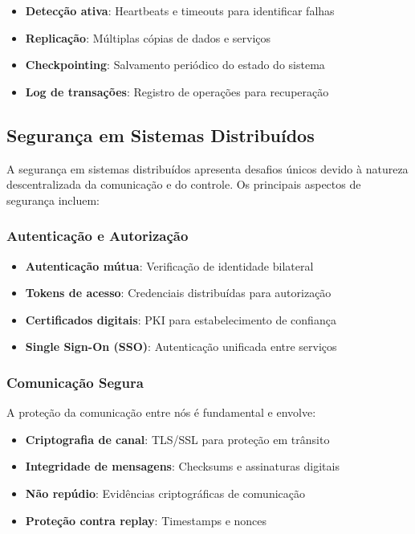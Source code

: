 \begin{itemize}
    \item \textbf{Detecção ativa}: Heartbeats e timeouts para identificar falhas
    \item \textbf{Replicação}: Múltiplas cópias de dados e serviços
    \item \textbf{Checkpointing}: Salvamento periódico do estado do sistema
    \item \textbf{Log de transações}: Registro de operações para recuperação
\end{itemize}

\subsection{Segurança em Sistemas Distribuídos}

A segurança em sistemas distribuídos apresenta desafios únicos devido à natureza descentralizada da comunicação e do controle. Os principais aspectos de segurança incluem:

\subsubsection{Autenticação e Autorização}

\begin{itemize}
    \item \textbf{Autenticação mútua}: Verificação de identidade bilateral
    \item \textbf{Tokens de acesso}: Credenciais distribuídas para autorização
    \item \textbf{Certificados digitais}: PKI para estabelecimento de confiança
    \item \textbf{Single Sign-On (SSO)}: Autenticação unificada entre serviços
\end{itemize}

\subsubsection{Comunicação Segura}

A proteção da comunicação entre nós é fundamental e envolve:

\begin{itemize}
    \item \textbf{Criptografia de canal}: TLS/SSL para proteção em trânsito
    \item \textbf{Integridade de mensagens}: Checksums e assinaturas digitais
    \item \textbf{Não repúdio}: Evidências criptográficas de comunicação
    \item \textbf{Proteção contra replay}: Timestamps e nonces
\end{itemize}



